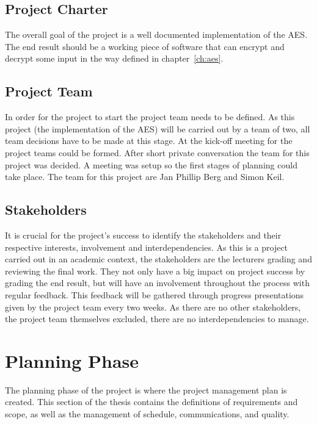 \subsection{Project Charter}
\label{ch:projectcharter}
\begin{tcolorbox}
  The overall goal of the project is a well documented implementation of the \ac{AES}. The end result should be a working piece of software that can encrypt and decrypt some input in the way defined in chapter~\ref{ch:aes}.
\end{tcolorbox}


\subsection{Project Team}
\label{ch:projectteam}
In order for the project to start the project team needs to be defined. As this project (the implementation of the \ac{AES}) will be carried out by a team of two, all team decisions have to be made at this stage. At the kick-off meeting for the project teams could be formed. After short private conversation the team for this project was decided. A meeting was setup so the first stages of planning could take place. The team for this project are Jan Phillip Berg and Simon Keil.

\subsection{Stakeholders}
\label{ch:stakeholders}
It is crucial for the project's success to identify the stakeholders and their respective interests, involvement and interdependencies. As this is a project carried out in an academic context, the stakeholders are the lecturers grading and reviewing the final work. They not only have a big impact on project success by grading the end result, but will have an involvement throughout the process with regular feedback. This feedback will be gathered through progress presentations given by the project team every two weeks. As there are no other stakeholders, the project team themselves excluded, there are no interdependencies to manage.


\section{Planning Phase}
\label{ch:planningphase}
The planning phase of the project is where the project management plan is created. This section of the thesis contains the definitions of requirements and scope, as well as the management of schedule, communications, and quality.

